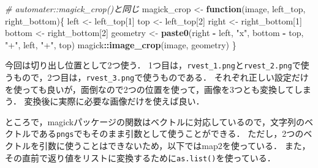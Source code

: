\documentclass[
]{article}
\newenvironment{Shaded}{\begin{snugshade}}{\end{snugshade}}
\newcommand{\CommentTok}[1]{\textcolor[rgb]{0.56,0.35,0.01}{\textit{#1}}}
\newcommand{\ControlFlowTok}[1]{\textcolor[rgb]{0.13,0.29,0.53}{\textbf{#1}}}
\newcommand{\DecValTok}[1]{\textcolor[rgb]{0.00,0.00,0.81}{#1}}
\newcommand{\FunctionTok}[1]{\textcolor[rgb]{0.13,0.29,0.53}{\textbf{#1}}}
\newcommand{\NormalTok}[1]{#1}
\newcommand{\OtherTok}[1]{\textcolor[rgb]{0.56,0.35,0.01}{#1}}
\newcommand{\SpecialCharTok}[1]{\textcolor[rgb]{0.81,0.36,0.00}{\textbf{#1}}}
\newcommand{\StringTok}[1]{\textcolor[rgb]{0.31,0.60,0.02}{#1}}
\begin{document}
\begin{Shaded}
\begin{Highlighting}[]
  \CommentTok{\# automater::magick\_crop()と同じ}
\NormalTok{magick\_crop }\OtherTok{\textless{}{-}} \ControlFlowTok{function}\NormalTok{(image, left\_top, right\_bottom)\{}
\NormalTok{  left   }\OtherTok{\textless{}{-}}\NormalTok{ left\_top[}\DecValTok{1}\NormalTok{]}
\NormalTok{  top    }\OtherTok{\textless{}{-}}\NormalTok{ left\_top[}\DecValTok{2}\NormalTok{]}
\NormalTok{  right  }\OtherTok{\textless{}{-}}\NormalTok{ right\_bottom[}\DecValTok{1}\NormalTok{]}
\NormalTok{  bottom }\OtherTok{\textless{}{-}}\NormalTok{ right\_bottom[}\DecValTok{2}\NormalTok{]}
\NormalTok{  geometry }\OtherTok{\textless{}{-}} \FunctionTok{paste0}\NormalTok{(right }\SpecialCharTok{{-}}\NormalTok{ left, }\StringTok{"x"}\NormalTok{, bottom }\SpecialCharTok{{-}}\NormalTok{ top, }\StringTok{"+"}\NormalTok{, left, }\StringTok{"+"}\NormalTok{, top)}
\NormalTok{  magick}\SpecialCharTok{::}\FunctionTok{image\_crop}\NormalTok{(image, geometry)}
\NormalTok{\}}
\end{Highlighting}
\end{Shaded}

今回は切り出し位置として2つ使う．
1つ目は，\texttt{rvest\_1.png}と\texttt{rvest\_2.png}で使うもので，2つ目は，\texttt{rvest\_3.png}で使うものである．
それぞれ正しい設定だけを使っても良いが，面倒なので2つの位置を使って，画像を3つとも変換してしまう．
変換後に実際に必要な画像だけを使えば良い．

ところで，magickパッケージの関数はベクトルに対応しているので，文字列のベクトルである\texttt{pngs}でもそのまま引数として使うことができる．
ただし，2つのベクトルを引数に使うことはできないため，以下ではmap2を使っている．
また，その直前で返り値をリストに変換するために\texttt{as.list()}を使っている．
\end{document}

